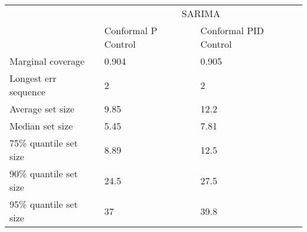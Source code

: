 \begin{tabular}{lll}
\toprule
& \multicolumn{2}{c}{SARIMA} \\
& Conformal P Control & Conformal PID Control \\
\midrule
Marginal coverage & 0.904 & 0.905 \\
Longest err sequence & 2 & 2 \\
Average set size & 9.85 & 12.2 \\
Median set size & 5.45 & 7.81 \\
75\% quantile set size & 8.89 & 12.5 \\
90\% quantile set size & 24.5 & 27.5 \\
95\% quantile set size & 37 & 39.8 \\
\bottomrule
\end{tabular}

